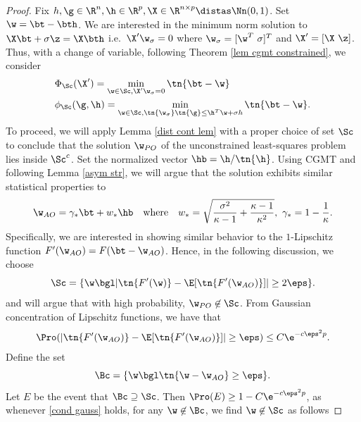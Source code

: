 \begin{proof} Fix $h,\g\in\R^n,\h\in\R^p,\X\in\R^{n\times p}\distas \Nn(0,1)$. Set $\w=\bt-\bth$. We are interested in the minimum norm solution to $\X\bt+\sigma\z=\X\bth$ i.e.~$\X'\w_\sigma=0$ where $\w_\sigma=[\w^T~\sigma]^T$ and $\X'=[\X~\z]$. Thus, with a change of variable, following Theorem \ref{lem cgmt constrained}, we consider
\begin{align}
&\Phi_\Sc(\X')=\min_{\w\in\Sc,\X'\w_\sigma=0}\tn{\bt-\w}\\
&\phi_\Sc(\g,\h)=\min_{\w\in\Sc,\tn{\w_\sigma}\tn{\g}\leq \h^T\w+\sigma h}\tn{\bt-\w}.\label{overparm phi}
\end{align}
To proceed, we will apply Lemma \ref{dist cont lem} with a proper choice of set $\Sc$ to conclude that the solution $\w_{PO}$ of the unconstrained least-squares problem lies inside $\Sc^c$. Set the normalized vector $\hb=\h/\tn{\h}$. Using CGMT and following Lemma \ref{asym str}, we will argue that the solution exhibits similar statistical properties to
\[
\w_{AO}=\gamma_*\bt+w_*\hb\quad\text{where}\quad w_*=\sqrt{\frac{\sigma^2}{\kappa-1}+\frac{\kappa-1}{\kappa^2}},~\gamma_*=1-\frac{1}{\kappa}.
\]
Specifically, we are interested in showing similar behavior to the $1$-Lipschitz function $F'(\w_{AO})=F(\bt-\w_{AO})$. Hence, in the following discussion, we choose 
\[
\Sc=\{\w\bgl |\tn{F'(\w)}-{\E[\tn{F'(\w_{AO})}]}|\geq 2\eps\}.
\]
and will argue that with high probability, $\w_{PO}\not\in\Sc$. From Gaussian concentration of Lipschitz functions, we have that
\begin{align}
\Pro(|\tn{F'(\w_{AO})}-\E[\tn{F'(\w_{AO})}]|\geq \eps)\leq C\e^{-c\eps^2p}.\label{cond gauss}
\end{align}
Define the set %
\[
\Bc=\{\w\bgl\tn{\w-\w_{AO}}\geq \eps\}.
\]
Let $E$ be the event that $\Bc\supseteq\Sc$. Then $\Pro(E)\geq 1-C\e^{-c\eps^2p}$, as whenever \eqref{cond gauss} holds, for any $\w\not\in\Bc$, we find $\w\not\in\Sc$ as follows

\end{proof}
